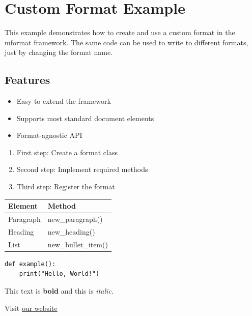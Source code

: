 \documentclass[a4paper]{report}
\begin{document}
\chapter{Custom Format Example}

This example demonstrates how to create and use a custom format in the mformat framework. The same code can be used to write to different formats, just by changing the format name.

\section{Features}
\begin{itemize}
\item Easy to extend the framework
\item Supports most standard document elements
\item Format-agnostic API
\end{itemize}
\begin{enumerate}
\item First step: Create a format class
\item Second step: Implement required methods
\item Third step: Register the format
\end{enumerate}

\noindent
\begin{tabular}{ll}
\toprule
\textbf{Element} & \textbf{Method} \\
\midrule
Paragraph & new\_paragraph() \\
Heading & new\_heading() \\
List & new\_bullet\_item() \\
\bottomrule
\end{tabular}
\par\medskip

\begin{verbatim}
def example():
    print("Hello, World!")
\end{verbatim}

This text is\textbf{ bold} and this is\textit{ italic}.

Visit \href{https://example.com}{our website}
\end{document}
